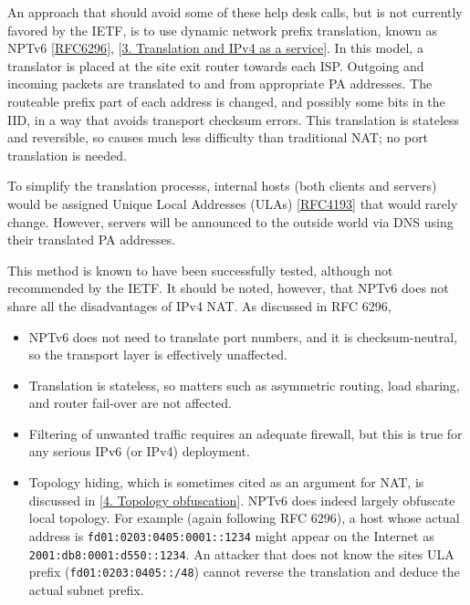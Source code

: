 \documentclass[
]{article}
\begin{document}
An approach that should avoid some of these help desk calls, but is not
currently favored by the IETF, is to use dynamic network prefix
translation, known as NPTv6
{[}\href{https://www.rfc-editor.org/info/rfc6296}{RFC6296}{]},
{[}\hyperref[translation-and-ipv4-as-a-service]{3. Translation and IPv4
as a service}{]}. In this model, a translator is placed at the site exit
router towards each ISP. Outgoing and incoming packets are translated to
and from appropriate PA addresses. The routeable prefix part of each
address is changed, and possibly some bits in the IID, in a way that
avoids transport checksum errors. This translation is stateless and
reversible, so causes much less difficulty than traditional NAT; no port
translation is needed.

To simplify the translation processs, internal hosts (both clients and
servers) would be assigned Unique Local Addresses (ULAs)
{[}\href{https://www.rfc-editor.org/info/rfc4193}{RFC4193}{]} that would
rarely change. However, servers will be announced to the outside world
via DNS using their translated PA addresses.

This method is known to have been successfully tested, although not
recommended by the IETF. It should be noted, however, that NPTv6 does
not share all the disadvantages of IPv4 NAT. As discussed in RFC 6296,

\begin{itemize}
\item
  NPTv6 does not need to translate port numbers, and it is
  checksum-neutral, so the transport layer is effectively unaffected.
\item
  Translation is stateless, so matters such as asymmetric routing, load
  sharing, and router fail-over are not affected.
\item
  Filtering of unwanted traffic requires an adequate firewall, but this
  is true for any serious IPv6 (or IPv4) deployment.
\item
  Topology hiding, which is sometimes cited as an argument for NAT, is
  discussed in {[}\hyperref[topology-obfuscation]{4. Topology
  obfuscation}{]}. NPTv6 does indeed largely obfuscate local topology.
  For example (again following RFC 6296), a host whose actual address is
  \texttt{fd01:0203:0405:0001::1234} might appear on the Internet as
  \texttt{2001:db8:0001:d550::1234}. An attacker that does not know the
  site\textquotesingle s ULA prefix (\texttt{fd01:0203:0405::/48})
  cannot reverse the translation and deduce the actual subnet prefix.
\end{itemize}
\end{document}
